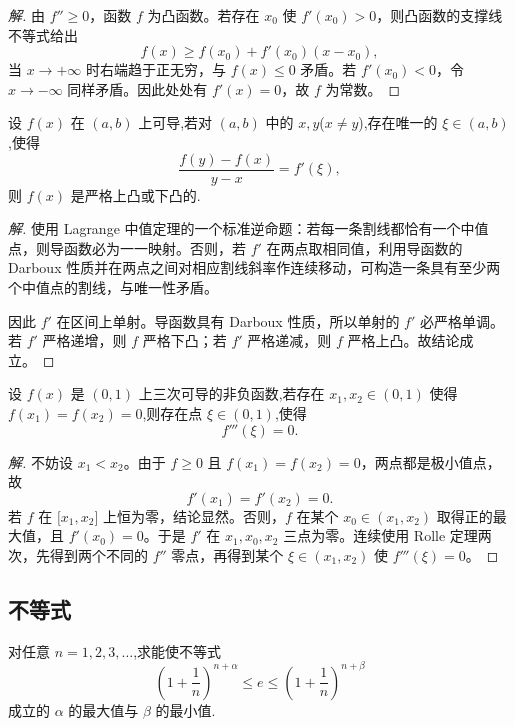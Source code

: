 \documentclass[../../数学分析培优讲义(答案版).tex]{subfiles}
\begin{document}
\begin{proof}[解]
由 $f''\geq0$，函数 $f$ 为凸函数。若存在 $x_0$ 使 $f'(x_0)>0$，则凸函数的支撑线不等式给出
\[
    f(x)\geq f(x_0)+f'(x_0)(x-x_0),
\]
当 $x\to+\infty$ 时右端趋于正无穷，与 $f(x)\leq0$ 矛盾。若 $f'(x_0)<0$，令 $x\to-\infty$ 同样矛盾。因此处处有 $f'(x)=0$，故 $f$ 为常数。
\end{proof}

\begin{example}
设 $f(x)$ 在 $(a,b)$ 上可导,若对 $(a,b)$ 中的 $x,y$($x\neq y$),存在唯一的 $\xi\in(a,b)$,使得
\[
    \dfrac{f(y)-f(x)}{y-x}=f'(\xi),
\]
则 $f(x)$ 是严格上凸或下凸的.
\end{example}

\begin{proof}[解]
使用 Lagrange 中值定理的一个标准逆命题：若每一条割线都恰有一个中值点，则导函数必为一一映射。否则，若 $f'$ 在两点取相同值，利用导函数的 Darboux 性质并在两点之间对相应割线斜率作连续移动，可构造一条具有至少两个中值点的割线，与唯一性矛盾。

因此 $f'$ 在区间上单射。导函数具有 Darboux 性质，所以单射的 $f'$ 必严格单调。若 $f'$ 严格递增，则 $f$ 严格下凸；若 $f'$ 严格递减，则 $f$ 严格上凸。故结论成立。
\end{proof}

\begin{example}
设 $f(x)$ 是 $(0,1)$ 上三次可导的非负函数,若存在 $x_1,x_2\in(0,1)$ 使得 $f(x_1)=f(x_2)=0$,则存在点 $\xi\in(0,1)$,使得
\[
    f'''(\xi)=0.
\]
\end{example}

\begin{proof}[解]
不妨设 $x_1<x_2$。由于 $f\geq0$ 且 $f(x_1)=f(x_2)=0$，两点都是极小值点，故
\[
    f'(x_1)=f'(x_2)=0.
\]
若 $f$ 在 $\lbrack x_1,x_2\rbrack$ 上恒为零，结论显然。否则，$f$ 在某个 $x_0\in(x_1,x_2)$ 取得正的最大值，且 $f'(x_0)=0$。于是 $f'$ 在 $x_1,x_0,x_2$ 三点为零。连续使用 Rolle 定理两次，先得到两个不同的 $f''$ 零点，再得到某个 $\xi\in(x_1,x_2)$ 使 $f'''(\xi)=0$。
\end{proof}

\subsection{不等式}


\begin{example}
对任意 $n=1,2,3,\ldots$,求能使不等式
\[
    \left(1+\dfrac{1}{n}\right)^{n+\alpha}
    \leq e
    \leq\left(1+\dfrac{1}{n}\right)^{n+\beta}
\]
成立的 $\alpha$ 的最大值与 $\beta$ 的最小值.
\end{example}
\end{document}
